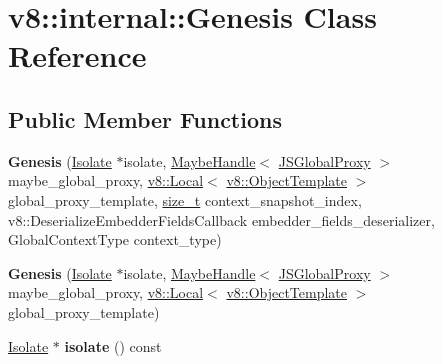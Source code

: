 \hypertarget{classv8_1_1internal_1_1Genesis}{}\section{v8\+:\+:internal\+:\+:Genesis Class Reference}
\label{classv8_1_1internal_1_1Genesis}
\subsection*{Public Member Functions}
\begin{DoxyCompactItemize}
\item 
\mbox{\label{classv8_1_1internal_1_1Genesis_a480e31b6dde356c87b3e124945304d3d}} 
{\bfseries Genesis} (\mbox{\hyperlink{classv8_1_1internal_1_1Isolate}{Isolate}} $\ast$isolate, \mbox{\hyperlink{classv8_1_1internal_1_1MaybeHandle}{Maybe\+Handle}}$<$ \mbox{\hyperlink{classv8_1_1internal_1_1JSGlobalProxy}{J\+S\+Global\+Proxy}} $>$ maybe\+\_\+global\+\_\+proxy, \mbox{\hyperlink{classv8_1_1Local}{v8\+::\+Local}}$<$ \mbox{\hyperlink{classv8_1_1ObjectTemplate}{v8\+::\+Object\+Template}} $>$ global\+\_\+proxy\+\_\+template, \mbox{\hyperlink{classsize__t}{size\+\_\+t}} context\+\_\+snapshot\+\_\+index, v8\+::\+Deserialize\+Embedder\+Fields\+Callback embedder\+\_\+fields\+\_\+deserializer, Global\+Context\+Type context\+\_\+type)
\item 
\mbox{\label{classv8_1_1internal_1_1Genesis_a99508d34e1f94cf35b5f82bca27c85cd}} 
{\bfseries Genesis} (\mbox{\hyperlink{classv8_1_1internal_1_1Isolate}{Isolate}} $\ast$isolate, \mbox{\hyperlink{classv8_1_1internal_1_1MaybeHandle}{Maybe\+Handle}}$<$ \mbox{\hyperlink{classv8_1_1internal_1_1JSGlobalProxy}{J\+S\+Global\+Proxy}} $>$ maybe\+\_\+global\+\_\+proxy, \mbox{\hyperlink{classv8_1_1Local}{v8\+::\+Local}}$<$ \mbox{\hyperlink{classv8_1_1ObjectTemplate}{v8\+::\+Object\+Template}} $>$ global\+\_\+proxy\+\_\+template)
\item 
\mbox{\label{classv8_1_1internal_1_1Genesis_a5be1d8efdbd0154e4cbdeae36b7bdff5}} 
\mbox{\hyperlink{classv8_1_1internal_1_1Isolate}{Isolate}} $\ast$ {\bfseries isolate} () const
\item 
\mbox{\label{classv8_1_1internal_1_1Genesis_aa37c3c11dedf7cdd11cee7be190c26ed}} 

\end{DoxyCompactItemize}
